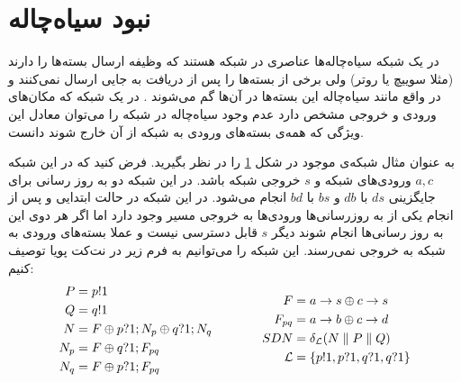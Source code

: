 \section{نبود سیاه‌چاله}
در یک شبکه سیاه‌چاله‌ها
عناصری در شبکه هستند که وظیفه ارسال بسته‌ها را دارند
(مثلا سوییچ‌ یا روتر)
ولی برخی از بسته‌ها را پس از دریافت به جایی ارسال نمی‌کنند و در واقع مانند سیاه‌چاله این بسته‌ها در آن‌ها گم می‌شوند
\cite{network-abstractions}.
در یک شبکه که مکان‌های ورودی و خروجی مشخص دارد عدم وجود سیاه‌چاله در شبکه را می‌توان معادل این ويژگی که همه‌ی بسته‌های ورودی به شبکه از آن خارج شوند دانست.
\begin{figure}
    \centering
    \caption{ }
    \label{fig:blackhole}
\end{figure}
به عنوان مثال شبکه‌ی موجود در شکل
\ref{fig:blackhole}
را در نظر بگیرید.
فرض کنید که در این شبکه
$a,c$
ورودی‌های شبکه و
$s$
خروجی شبکه باشد.
در این شبکه دو به روز رسانی برای جایگزینی
$ds$
با
$db$
و
$bs$
با
$bd$
انجام می‌شود.
در این شبکه در حالت ابتدایی و پس از انجام یکی از به روز‌رسانی‌ها ورودی‌ها به خروجی مسیر وجود دارد اما اگر هر دوی این به روز رسانی‌ها انجام شوند دیگر
$s$
قابل دسترسی نیست و عملا بسته‌های ورودی به شبکه به خروجی نمی‌رسند.
این شبکه را می‌توانیم به فرم زیر در نت‌کت پویا توصیف کنیم:
\begin{equation*}
    \begin{aligned}[c]
        P   & = p!1                             \\
        Q   & = q!1                             \\
        N   & = F \oplus p?1;N_p \oplus q?1;N_q \\
        N_p & = F \oplus q?1;F_{pq}             \\
        N_q & = F \oplus p?1;F_{pq}
    \end{aligned}
    \qquad\qquad
    \begin{aligned}[c]
        F           & = a\rightarrow s \oplus c\rightarrow s            \\
        F_{pq}      & = a\rightarrow b \oplus c\rightarrow d            \\
        SDN         & = \delta_{\mathcal{L}} (N
        \parallel P \parallel Q)                \\
        \mathcal{L} & = \{p!1,p?1,q?1,q?1\}
    \end{aligned}
\end{equation*}
